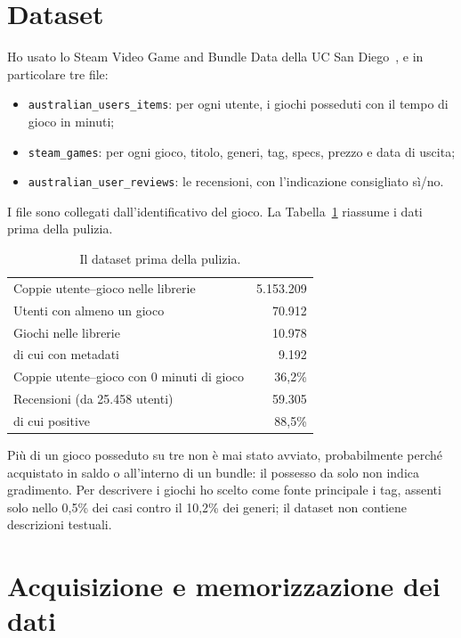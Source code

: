 \documentclass[11pt,a4paper]{article}
\begin{document}
\section{Dataset}

Ho usato lo Steam Video Game and Bundle Data della UC San
Diego~\cite{dataset}, e in particolare tre file:
\begin{itemize}
  \item \texttt{australian\_users\_items}: per ogni utente, i giochi posseduti
        con il tempo di gioco in minuti;
  \item \texttt{steam\_games}: per ogni gioco, titolo, generi, tag, specs,
        prezzo e data di uscita;
  \item \texttt{australian\_user\_reviews}: le recensioni, con l'indicazione
        consigliato sì/no.
\end{itemize}
I file sono collegati dall'identificativo del gioco. La
Tabella~\ref{tab:dataset} riassume i dati prima della pulizia.

\begin{table}[h]
\centering
\begin{tabular}{lr}
\toprule
Coppie utente--gioco nelle librerie & 5.153.209 \\
Utenti con almeno un gioco & 70.912 \\
Giochi nelle librerie & 10.978 \\
\quad di cui con metadati & 9.192 \\
Coppie utente--gioco con 0 minuti di gioco & 36,2\% \\
Recensioni (da 25.458 utenti) & 59.305 \\
\quad di cui positive & 88,5\% \\
\bottomrule
\end{tabular}
\caption{Il dataset prima della pulizia.}
\label{tab:dataset}
\end{table}

Più di un gioco posseduto su tre non è mai stato avviato, probabilmente perché
acquistato in saldo o all'interno di un bundle: il possesso da solo non indica
gradimento. Per descrivere i giochi ho scelto come fonte principale i tag,
assenti solo nello 0,5\% dei casi contro il 10,2\% dei generi; il dataset non
contiene descrizioni testuali.

\section{Acquisizione e memorizzazione dei dati}
\end{document}
